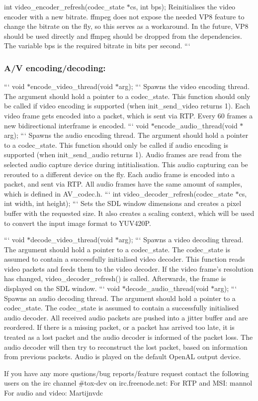 int video\+\_\+encoder\+\_\+refresh(codec\+\_\+state $\ast$cs, int bps); Reinitialises the video encoder with a new bitrate. ffmpeg does not expose the needed V\+P8 feature to change the bitrate on the fly, so this serves as a workaround. In the future, V\+P8 should be used directly and ffmpeg should be dropped from the dependencies. The variable bps is the required bitrate in bits per second. ```

\subsubsection*{A/\+V encoding/decoding\+:}

``` void $\ast$encode\+\_\+video\+\_\+thread(void $\ast$arg); ``` Spawns the video encoding thread. The argument should hold a pointer to a codec\+\_\+state. This function should only be called if video encoding is supported (when init\+\_\+send\+\_\+video returns 1). Each video frame gets encoded into a packet, which is sent via R\+T\+P. Every 60 frames a new bidirectional interframe is encoded. ``` void $\ast$encode\+\_\+audio\+\_\+thread(void $\ast$arg); ``` Spawns the audio encoding thread. The argument should hold a pointer to a codec\+\_\+state. This function should only be called if audio encoding is supported (when init\+\_\+send\+\_\+audio returns 1). Audio frames are read from the selected audio capture device during intitialisation. This audio capturing can be rerouted to a different device on the fly. Each audio frame is encoded into a packet, and sent via R\+T\+P. All audio frames have the same amount of samples, which is defined in A\+V\+\_\+codec.\+h. ``` int video\+\_\+decoder\+\_\+refresh(codec\+\_\+state $\ast$cs, int width, int height); ``` Sets the S\+D\+L window dimensions and creates a pixel buffer with the requested size. It also creates a scaling context, which will be used to convert the input image format to Y\+U\+V420\+P.

``` void $\ast$decode\+\_\+video\+\_\+thread(void $\ast$arg); ``` Spawns a video decoding thread. The argument should hold a pointer to a codec\+\_\+state. The codec\+\_\+state is assumed to contain a successfully initialised video decoder. This function reads video packets and feeds them to the video decoder. If the video frame's resolution has changed, video\+\_\+decoder\+\_\+refresh() is called. Afterwards, the frame is displayed on the S\+D\+L window. ``` void $\ast$decode\+\_\+audio\+\_\+thread(void $\ast$arg); ``` Spawns an audio decoding thread. The argument should hold a pointer to a codec\+\_\+state. The codec\+\_\+state is assumed to contain a successfully initialised audio decoder. All received audio packets are pushed into a jitter buffer and are reordered. If there is a missing packet, or a packet has arrived too late, it is treated as a lost packet and the audio decoder is informed of the packet loss. The audio decoder will then try to reconstruct the lost packet, based on information from previous packets. Audio is played on the default Open\+A\+L output device.

If you have any more qustions/bug reports/feature request contact the following users on the irc channel \#tox-\/dev on irc.\+freenode.\+net\+: For R\+T\+P and M\+S\+I\+: mannol For audio and video\+: Martijnvdc 